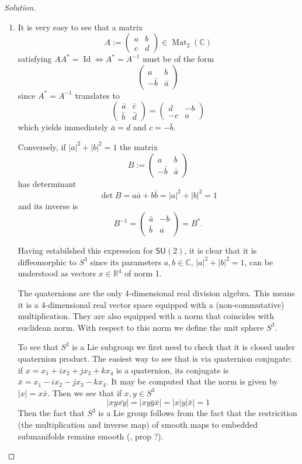 \begin{proof}[Solution]\leavevmode
	\begin{enumerate}[label=\alph*.]
		\item It is very easy to see that a matrix 
			\[A:=\begin{pmatrix} a &b\\c & d \end{pmatrix} \in\operatorname{Mat}_{2}(\mathbb{C})\]
			satisfying $A A^*=\operatorname{Id}\iff A^*=A^{-1}$ must be of the form
			\[\begin{pmatrix} a &b\\-\bar{b}&\bar{a} \end{pmatrix} \]
			since $A^*=A^{-1}$ translates to
			\[\begin{pmatrix} \bar{a} &\bar{c}\\\bar{b}&\bar{d} \end{pmatrix} =\begin{pmatrix} d&-b\\-c&a\end{pmatrix} \]
			which yields immediately $\bar{a} =d$ and $c=-\bar{b}$.

			Conversely, if $|a|^2+|b|^2=1$ the matrix \[B:=\begin{pmatrix} a &b\\-\bar{b}&\bar{a} \end{pmatrix}\] has determinant
			 \[\det B=a\bar{a}+b \bar{b}=|a|^2+|b|^2=1 \]
			 and its inverse is
			 \[B^{-1}=\begin{pmatrix} \bar{a}&-b\\\bar{b}&a \end{pmatrix} =B^*.\]


			Having estabilshed this expression for $\mathsf{SU}(2)$, it is clear that it is diffeomorphic to $S^3$ since its parameters $a,b\in\mathbb{C}$, $|a|^2+|b|^2=1$, can be understood as vectors $x\in\mathbb{R}^{4}$ of norm 1.

		The quaternions are the only 4-dimensional real division algebra. This means it is a 4-dimensional real vector space equipped with a (non-commutative) multiplication. They are also equipped with a norm that coincides with euclidean norm. With respect to this norm we define the unit sphere $S^3$. 
		
			To see that $S^3$ is a Lie subgroup we first need to check that it is closed under quaternion product. The easiest way to see that is via quaternion conjugate: if $x=x_1+ix_2+jx_3+kx_4$ is a quaternion, its conjugate is $\bar{x}=x_1-ix_2-jx_3-kx_4$. It may be computed that the norm is given by $|x| =x\bar{x}$. Then we see that if $x,y\in S^3$
			\[|xy\overline{xy}|=|xy\bar{y}\bar{x}| =\Big|x|y| \bar{x}\Big|=1\]
			Then the fact that $S^3$ is a Lie group follows from the fact that the restricition (the multiplication and inverse map) of smooth maps to embedded submanifolds remains smooth (\cite{lee}, prop ?).


\end{enumerate}
\end{proof}
